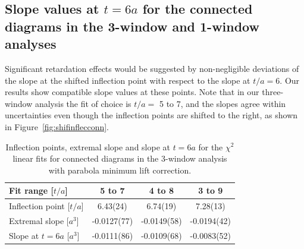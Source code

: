 \subsection{Slope values at $t=6a$ for the connected diagrams in the 
3-window and 1-window analyses}
\label{ritardation_connected}
Significant retardation effects would be suggested by non-negligible deviations
of the slope at the shifted inflection point with respect to the slope at $t/a=6$. 
Our results show compatible slope values at these points. Note that in our three-
window analysis the fit of choice is $t/a=$ 5 to 7, and the slopes agree within 
uncertainties even though the inflection points are shifted to the right, as shown
in Figure~\ref{fig:shifinflecconn}.
\begin{table}[H]
\begin{center}
    \begin{tabular}{ | l | c | c | c |}
    \hline
     Fit range [$t/a$] & 5 to 7    & 4 to 8 & 3 to 9      \\ 
     \hline
        	Inflection point [$t/a$] &   6.43(24)         &      6.74(19)    &    7.28(13)   \\ \hline
        Extremal slope [$a^3$] &    -0.0127(77)        &     -0.0149(58)    &      -0.0194(42) \\ \hline
 	Slope at $t=6a$ [$a^3$] &    -0.0111(86)        &     -0.0109(68)   &     -0.0083(52)   \\ \hline
    
    \end{tabular}
\end{center}
\caption{Inflection points, extremal slope and slope at $t=6a$ for the $\chi^2$
linear fits for connected diagrams in the 3-window analysis with parabola minimum lift correction.}
\label{tab:Retardation3wMultiPoint}
\end{table}



